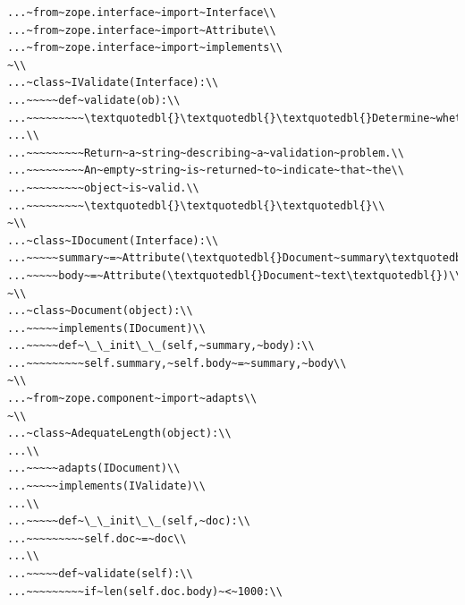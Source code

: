 \documentclass[a4paper,openany,twoside,draft]{book}
\begin{document}
\begin{verbatim}
...~from~zope.interface~import~Interface\\
...~from~zope.interface~import~Attribute\\
...~from~zope.interface~import~implements\\
~\\
...~class~IValidate(Interface):\\
...~~~~~def~validate(ob):\\
...~~~~~~~~~\textquotedbl{}\textquotedbl{}\textquotedbl{}Determine~whether~the~object~is~valid\\
...\\
...~~~~~~~~~Return~a~string~describing~a~validation~problem.\\
...~~~~~~~~~An~empty~string~is~returned~to~indicate~that~the\\
...~~~~~~~~~object~is~valid.\\
...~~~~~~~~~\textquotedbl{}\textquotedbl{}\textquotedbl{}\\
~\\
...~class~IDocument(Interface):\\
...~~~~~summary~=~Attribute(\textquotedbl{}Document~summary\textquotedbl{})\\
...~~~~~body~=~Attribute(\textquotedbl{}Document~text\textquotedbl{})\\
~\\
...~class~Document(object):\\
...~~~~~implements(IDocument)\\
...~~~~~def~\_\_init\_\_(self,~summary,~body):\\
...~~~~~~~~~self.summary,~self.body~=~summary,~body\\
~\\
...~from~zope.component~import~adapts\\
~\\
...~class~AdequateLength(object):\\
...\\
...~~~~~adapts(IDocument)\\
...~~~~~implements(IValidate)\\
...\\
...~~~~~def~\_\_init\_\_(self,~doc):\\
...~~~~~~~~~self.doc~=~doc\\
...\\
...~~~~~def~validate(self):\\
...~~~~~~~~~if~len(self.doc.body)~<~1000:\\

\end{verbatim}
\end{document}
